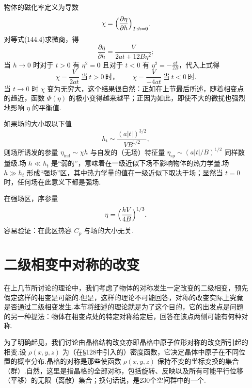 物体的磁化率定义为导数
\begin{equation}
  \chi=\Bigl(\frac{\partial\eta}{\partial h}\Bigr)_{T:h=0}.
\end{equation}
对等式(144.4)求微商，得
\begin{equation*}
  \frac{\partial\eta}{\partial h}=\frac{V}{2at+12B\eta^2};
\end{equation*}
当 $h\to0$ 时对于 $t>0$ 有 $\eta^2=0$ 且对于 $t<0$ 有 $\eta^2=-\frac{at}{2B}$，代入上式得
\begin{equation}
  \chi=\frac{V}{2at}\ \text{当}\ t>0\ \text{时，}\qquad
  \chi=\frac{V}{-4at}\ \text{当}\ t<0\ \text{时.}
\end{equation}
当 $t\to0$ 时 $\chi$ 变为无穷大，这个结果很自然：正如在上节最后所述，随着相变点的趋近，函数 $\Phi(\eta)$ 的极小变得越来越平；正因为如此，即使不大的微扰也强烈地影响 $\eta$ 的平衡值.

如果场的大小取以下值
\begin{equation*}
  h_t\sim\frac{(a|t|)^{3/2}}{VB^{1/2}},
\end{equation*}
则场所诱发的参量 $\eta_{\mathrm{ind}}\sim\chi h$ 与自发的（无场）特征量 $\eta_{\mathrm{sp}}\sim(a|t|/B)^{1/2}$ 同样数量级.场 $h\ll h_t$ 是“弱的”，意味着在一级近似下场不影响物体的热力学量.场 $h\gg h_t$ 形成“强场”区，其中热力学量的值在一级近似下取决于场；显然当 $t=0$ 时，任何场在此意义下都是强场.

在强场区，序参量
\begin{equation}
  \eta=\Bigl(\frac{hV}{4B}\Bigr)^{1/3}.
\end{equation}
容易验证：在此区热容 $C_p$ 与场的大小无关.

\section{二级相变中对称的改变}

在上几节所讨论的理论中，我们考虑了物体的对称发生一定改变的二级相变，预先假定这样的相变是可能的.但是，这样的理论不可能回答，对称的改变实际上究竟是否通过二级相变发生.本节将细述的理论就是为了这个目的，它的出发点是问题的另一种提法：物体在相变点处的特定对称给定后，回答在该点两侧可能有何种对称.

为了明确起见，我们讨论由晶格结构改变亦即晶格中原子位形对称的改变所引起的相变.设 $\rho(x,y,z)$ 为（在§128中引入的）密度函数，它决定晶体中原子在不同位置的概率分布.晶格的对称是那些使函数 $\rho(x,y,z)$ 保持不变的坐标变换的集合（群）.自然，这里是指晶格的全部对称，包括旋转、反映以及所有可能平行位移（平移）的无限（离散）集合；换句话说，是230个空间群中的一个.

